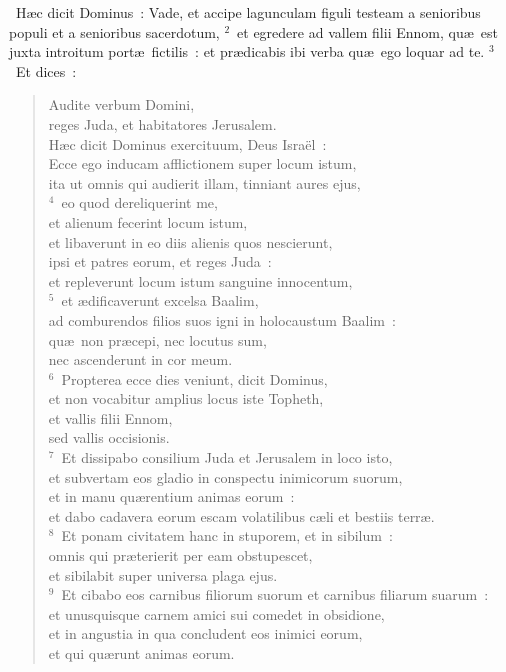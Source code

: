 ~H\ae c dicit Dominus~: Vade, et accipe lagunculam figuli testeam a senioribus populi et a senioribus sacerdotum,
${}^{2}$~et egredere ad vallem filii Ennom, qu\ae\ est juxta introitum port\ae\ fictilis~: et pr\ae dicabis ibi verba qu\ae\ ego loquar ad te.
${}^{3}$~Et dices~: \begin{flushleft}\begin{verse}Audite verbum Domini,\\ reges Juda, et habitatores Jerusalem.\\ H\ae c dicit Dominus exercituum, Deus Isra\"el~:\\ Ecce ego inducam afflictionem super locum istum,\\ ita ut omnis qui audierit illam, tinniant aures ejus,\\
${}^{4}$~eo quod dereliquerint me,\\ et alienum fecerint locum istum,\\ et libaverunt in eo diis alienis quos nescierunt,\\ ipsi et patres eorum, et reges Juda~:\\ et repleverunt locum istum sanguine innocentum,\\
${}^{5}$~et \ae dificaverunt excelsa Baalim,\\ ad comburendos filios suos igni in holocaustum Baalim~:\\ qu\ae\ non pr\ae cepi, nec locutus sum,\\ nec ascenderunt in cor meum.\\
${}^{6}$~Propterea ecce dies veniunt, dicit Dominus,\\ et non vocabitur amplius locus iste Topheth,\\ et vallis filii Ennom,\\ sed vallis occisionis.\\
${}^{7}$~Et dissipabo consilium Juda et Jerusalem in loco isto,\\ et subvertam eos gladio in conspectu inimicorum suorum,\\ et in manu qu\ae rentium animas eorum~:\\ et dabo cadavera eorum escam volatilibus c\ae li et bestiis terr\ae .\\
${}^{8}$~Et ponam civitatem hanc in stuporem, et in sibilum~:\\ omnis qui pr\ae terierit per eam obstupescet,\\ et sibilabit super universa plaga ejus.\\
${}^{9}$~Et cibabo eos carnibus filiorum suorum et carnibus filiarum suarum~:\\ et unusquisque carnem amici sui comedet in obsidione,\\ et in angustia in qua concludent eos inimici eorum,\\ et qui qu\ae runt animas eorum.\end{verse}\end{flushleft}


